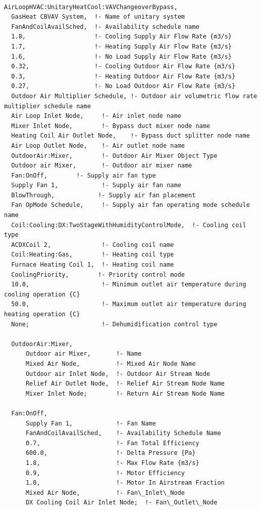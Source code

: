 \begin{lstlisting}

AirLoopHVAC:UnitaryHeatCool:VAVChangeoverBypass,
  GasHeat CBVAV System,  !- Name of unitary system
  FanAndCoilAvailSched,  !- Availability schedule name
  1.8,                   !- Cooling Supply Air Flow Rate {m3/s}
  1.7,                   !- Heating Supply Air Flow Rate {m3/s}
  1.6,                   !- No Load Supply Air Flow Rate {m3/s}
  0.32,                  !- Cooling Outdoor Air Flow Rate {m3/s}
  0.3,                   !- Heating Outdoor Air Flow Rate {m3/s}
  0.27,                  !- No Load Outdoor Air Flow Rate {m3/s}
  Outdoor Air Multiplier Schedule, !- Outdoor air volumetric flow rate multiplier schedule name
  Air Loop Inlet Node,     !- Air inlet node name
  Mixer Inlet Node,        !- Bypass duct mixer node name
  Heating Coil Air Outlet Node,    !- Bypass duct splitter node name
  Air Loop Outlet Node,    !- Air outlet node name
  OutdoorAir:Mixer,        !- Outdoor Air Mixer Object Type
  Outdoor air Mixer,       !- Outdoor air mixer name
  Fan:OnOff,        !- Supply air fan type
  Supply Fan 1,            !- Supply air fan name
  BlowThrough,            !- Supply air fan placement
  Fan OpMode Schedule,     !- Supply air fan operating mode schedule name
  Coil:Cooling:DX:TwoStageWithHumidityControlMode,  !- Cooling coil type
  ACDXCoil 2,              !- Cooling coil name
  Coil:Heating:Gas,        !- Heating coil type
  Furnace Heating Coil 1,  !- Heating coil name
  CoolingPriority,        !- Priority control mode
  10.0,                    !- Minimum outlet air temperature during cooling operation {C}
  50.0,                    !- Maximum outlet air temperature during heating operation {C}
  None;                    !- Dehumidification control type

  OutdoorAir:Mixer,
      Outdoor air Mixer,       !- Name
      Mixed Air Node,          !- Mixed Air Node Name
      Outdoor air Inlet Node,  !- Outdoor Air Stream Node
      Relief Air Outlet Node,  !- Relief Air Stream Node Name
      Mixer Inlet Node;        !- Return Air Stream Node Name

  Fan:OnOff,
      Supply Fan 1,            !- Fan Name
      FanAndCoilAvailSched,    !- Availability Schedule Name
      0.7,                     !- Fan Total Efficiency
      600.0,                   !- Delta Pressure {Pa}
      1.8,                     !- Max Flow Rate {m3/s}
      0.9,                     !- Motor Efficiency
      1.0,                     !- Motor In Airstream Fraction
      Mixed Air Node,          !- Fan\_Inlet\_Node
      DX Cooling Coil Air Inlet Node;  !- Fan\_Outlet\_Node


\end{lstlisting}
